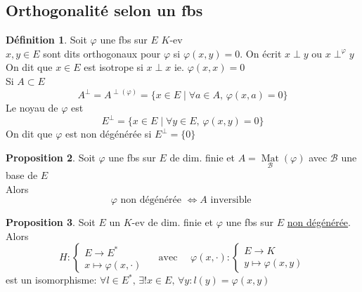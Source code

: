 \documentclass[10pt,a4paper]{article}
\theoremstyle{definition}
\newtheorem{proposition}{Proposition}[section]
\newtheorem{definition}[proposition]{Définition}
\DeclareMathOperator*{\mat}{Mat}
\begin{document}
\subsection{Orthogonalité selon un fbs}
\begin{definition}
    Soit \(\varphi\) une fbs sur \(E\) \(K\)-ev \\
    \(x, y \in E\) sont dits orthogonaux pour \(\varphi\) si \(\varphi(x, y) = 0\). On écrit \(x \perp y\) ou \(x \perp^\varphi y\) \\
    On dit que \(x \in E\) est isotrope si \(x \perp x\) ie. \(\varphi(x, x) = 0\) \\
    Si \(A \subset E\) 
    \[A^\perp = A^{\perp(\varphi)} = \{x \in E \mid \forall a \in A,\, \varphi(x, a) = 0 \}\]
    Le noyau de \(\varphi\) est 
    \[E^\perp = \{x \in E \mid \forall y \in E,\, \varphi(x, y) = 0\}\]
    On dit que \(\varphi\) est non dégénérée si \(E^\perp = \{ 0 \}\)
\end{definition}
\begin{proposition}
    Soit \(\varphi\) une fbs sur \(E\) de dim. finie et \(A = \mat\limits_{\mathcal{B}}(\varphi)\) avec \(\mathcal{B}\) une base de \(E\) \\
    Alors \[\boxed{\varphi \text{ non dégénérée } \iff A \text{ inversible }}\]
\end{proposition}
\begin{proposition}
    Soit \(E\) un \(K\)-ev de dim. finie et \(\varphi\) une fbs sur \(E\) \uline{non dégénérée}. \\
    Alors \[H: \begin{cases}
        E \to E^* \\
        x \mapsto \varphi(x, \cdot)
    \end{cases} \quad \text{ avec } \quad \varphi(x, \cdot): \begin{cases}
        E \to K \\
        y \mapsto \varphi(x, y)
    \end{cases}\]
    est un isomorphisme: \(\forall l \in E^*,\, \exists! x \in E,\, \forall y : l(y) = \varphi(x, y)\)
\end{proposition}
\end{document}
